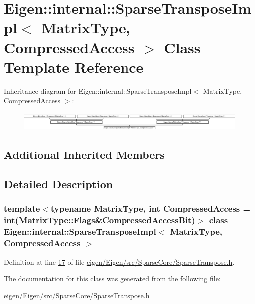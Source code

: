 \hypertarget{class_eigen_1_1internal_1_1_sparse_transpose_impl}{}\section{Eigen\+:\+:internal\+:\+:Sparse\+Transpose\+Impl$<$ Matrix\+Type, Compressed\+Access $>$ Class Template Reference}
\label{class_eigen_1_1internal_1_1_sparse_transpose_impl}
Inheritance diagram for Eigen\+:\+:internal\+:\+:Sparse\+Transpose\+Impl$<$ Matrix\+Type, Compressed\+Access $>$\+:\begin{figure}[H]
\begin{center}
\leavevmode
\includegraphics[height=0.965517cm]{class_eigen_1_1internal_1_1_sparse_transpose_impl}
\end{center}
\end{figure}
\subsection*{Additional Inherited Members}


\subsection{Detailed Description}
\subsubsection*{template$<$typename Matrix\+Type, int Compressed\+Access = int(\+Matrix\+Type\+::\+Flags\&\+Compressed\+Access\+Bit)$>$\newline
class Eigen\+::internal\+::\+Sparse\+Transpose\+Impl$<$ Matrix\+Type, Compressed\+Access $>$}



Definition at line \hyperlink{eigen_2_eigen_2src_2_sparse_core_2_sparse_transpose_8h_source_l00017}{17} of file \hyperlink{eigen_2_eigen_2src_2_sparse_core_2_sparse_transpose_8h_source}{eigen/\+Eigen/src/\+Sparse\+Core/\+Sparse\+Transpose.\+h}.



The documentation for this class was generated from the following file\+:\begin{DoxyCompactItemize}
\item 
eigen/\+Eigen/src/\+Sparse\+Core/\+Sparse\+Transpose.\+h\end{DoxyCompactItemize}

